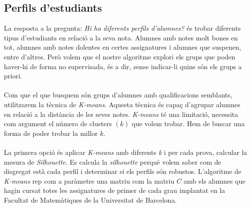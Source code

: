 \documentclass[12pt,a4paper,catalan]{article}
\begin{document}
\newpage
\subsection{Perfils d'estudiants}
\label{subsec:perfilsestudiants}
La resposta a la pregunta: \textit{Hi ha diferents perfils d'alumnes?} és trobar diferents tipus d'estudiants en relació a la seva nota. Alumnes amb notes molt bones en tot, alumnes amb notes dolentes en certes assignatures i alumnes que suspenen, entre d'altres. Però volem que el nostre algoritme explori els grups que poden haver-hi de forma no supervisada, és a dir, sense indicar-li quins són els grups a priori.
\\
\\
Com que el que busquem són grups d'alumnes amb qualificacions semblants, utilitzarem la tècnica de \textit{K-means}. Aquesta tècnica és capaç d'agrupar alumnes en relació a la distància de les seves notes. \textit{K-means} té una limitació, necessita com argument el número de clusters $(k)$ que volem trobar. Hem de buscar una forma de poder trobar la millor $k$.
\\
\\
La primera opció és aplicar \textit{K-means} amb diferents \textit{k} i per cada prova, calcular la mesura de \textit{Silhouette}. Es calcula la \textit{silhouette} perquè volem saber com de disgregat està cada perfil i determinar si els perfils són robustos. L'algoritme de \textit{K-means} rep com a paràmetre una matriu com la matriu $C$ amb els alumnes que hagin cursat totes les assignatures de primer de cada grau implantat en la Facultat de Matemàtiques de la Universitat de Barcelona. 
\end{document}
